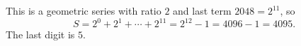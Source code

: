 This is a geometric series with ratio $2$ and last term $2048=2^{11}$, so
\[
S=2^0+2^1+\cdots+2^{11}=2^{12}-1=4096-1=4095 .
\]
The last digit is $\boxed{5}$.
